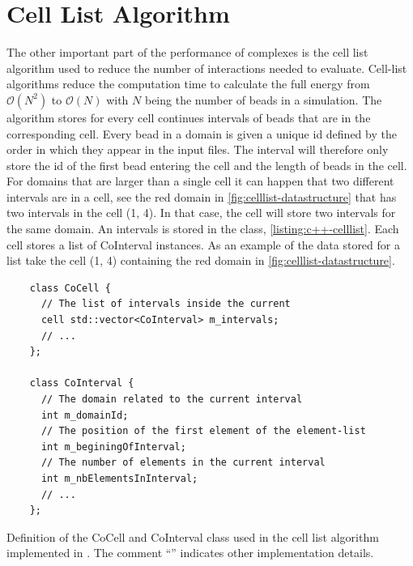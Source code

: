\documentclass[12pt, twoside]{report}
\begin{document}
\section{Cell List Algorithm}

The other important part of the performance of complexes is the cell list
algorithm \cite{frenkel2001understanding} used to reduce the number of
interactions needed to evaluate. Cell-list algorithms reduce the computation
time to calculate the full energy from \(\mathcal{O}(N^2)\) to
\(\mathcal{O}(N)\) with \(N\) being the number of beads in a simulation. The
algorithm stores for every cell continues intervals of beads that are in the
corresponding cell. Every bead in a domain is given a unique id defined by the
order in which they appear in the input files. The interval will therefore only
store the id of the first bead entering the cell and the length of beads in the
cell. For domains that are larger than a single cell it can happen that two
different intervals are in a cell, see the red domain in
\cref{fig:celllist-datastructure} that has two intervals in the cell (1, 4). In
that case, the cell will store two intervals for the same domain. An intervals
is stored in the  class, \cref{listing:c++-celllist}.
Each cell stores a list of CoInterval instances. As an example of the data
stored for a list take the cell (1, 4) containing the red domain in
\cref{fig:celllist-datastructure}.
\begin{listing}[!ht]
  \begin{verbatim}
    class CoCell {
      // The list of intervals inside the current
      cell std::vector<CoInterval> m_intervals;
      // ...
    };

    class CoInterval {
      // The domain related to the current interval
      int m_domainId;
      // The position of the first element of the element-list
      int m_beginingOfInterval;
      // The number of elements in the current interval
      int m_nbElementsInInterval;
      // ...
    };
\end{verbatim}
\caption{Definition of the CoCell and CoInterval class used in the cell list
algorithm implemented in \complexes. The comment ``'' indicates
other implementation details.}
\label{listing:c++-celllist}
\end{listing}
\end{document}
